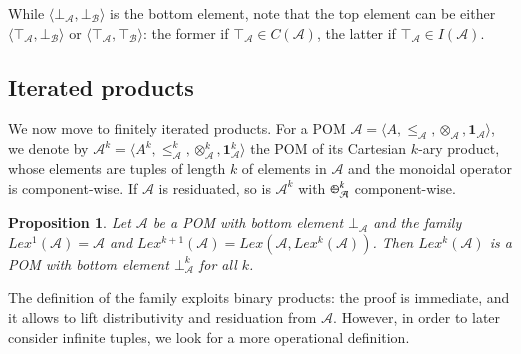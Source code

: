 \documentclass[a4paper]{elsarticle}
\newtheorem{proposition}{Proposition}
\newcommand{\monop}{\otimes}
\newcommand{\1}{\mathbf{1}}
\def\odiv{{ \ominus\hspace{-8pt}:}\;}
\begin{document}
While $\langle \bot_\mathcal{A}, \bot_\mathcal{B} \rangle$ is the bottom element, note that the top element can be 
either $\langle \top_\mathcal{A}, \bot_\mathcal{B} \rangle$ or $\langle \top_\mathcal{A}, \top_\mathcal{B} \rangle$:
the former if $\top_\mathcal{A} \in C(\mathcal{A})$, the latter if $\top_\mathcal{A} \in I(\mathcal{A})$.

\subsection{Iterated products}

We now move to finitely iterated products. For a POM 
$\mathcal{A} = \langle A, \leq_\mathcal{A}, \monop_\mathcal{A}, \1_\mathcal{A} \rangle$, 
we denote by $\mathcal{A}^k =  \langle A^k, \leq^k_\mathcal{A}, \monop^k_\mathcal{A}, \1^k_\mathcal{A} \rangle$
the POM of its Cartesian $k$-ary product, whose elements are tuples of length $k$
of elements in $\mathcal{A}$ and the monoidal operator is component-wise.
%
If $\mathcal{A}$ is residuated, so is $\mathcal{A}^k$ with $\odiv^k_\mathcal{A}$ component-wise.

\begin{proposition}\label{def:lexilist}
	Let $\mathcal{A}$ be a POM with bottom element $\bot_\mathcal{A}$
	and the family 
	$Lex^1(\mathcal{A}) = \mathcal{A}$ and $Lex^{k+1}(\mathcal{A}) = Lex(\mathcal{A}, Lex^k(\mathcal{A}))$.
	Then $Lex^k(\mathcal{A})$ is a POM with bottom element $\bot^k_\mathcal{A}$ for all $k$.
\end{proposition}

The definition of the family exploits binary products: the proof is immediate,
and it allows to lift distributivity and residuation from $\mathcal{A}$.
However, in order to later consider infinite tuples, we look for 
a more operational definition. %
\end{document}
